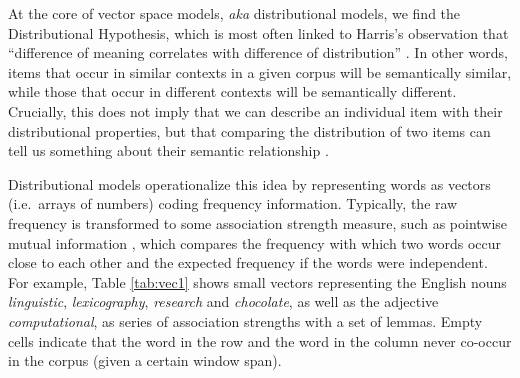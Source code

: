 \documentclass[
]{book}
\begin{document}
At the core of vector space models, \emph{aka} distributional models, we find the Distributional Hypothesis, which is most often linked to Harris's observation that ``difference of meaning correlates with difference of distribution'' \autocite*[ 156]{harris_1954}. In other words, items that occur in similar contexts in a given corpus will be semantically similar, while those that occur in different contexts will be semantically different. Crucially, this does not imply that we can describe an individual item with their distributional properties, but that comparing the distribution of two items can tell us something about their semantic relationship \autocite[ 19]{sahlgren_2006}.

Distributional models operationalize this idea by representing words as vectors (i.e.~arrays of numbers) coding frequency information. Typically, the raw frequency is transformed to some association strength measure, such as pointwise mutual information \autocite[PMI, see][]{church.hanks_1989}, which compares the frequency with which two words occur close to each other and the expected frequency if the words were independent. For example, Table \ref{tab:vec1} shows small vectors representing the English nouns \emph{linguistic}, \emph{lexicography}, \emph{research} and \emph{chocolate}, as well as the adjective \emph{computational}, as series of association strengths with a set of lemmas. Empty cells indicate that the word in the row and the word in the column never co-occur in the corpus (given a certain window span).

\providecommand{\docline}[3]{\noalign{\global\setlength{\arrayrulewidth}{#1}}\arrayrulecolor[HTML]{#2}\cline{#3}}

\setlength{\tabcolsep}{2pt}

\renewcommand*{\arraystretch}{1.5}
\end{document}
